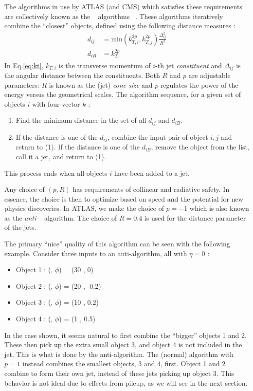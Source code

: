 The algorithms in use by ATLAS (and CMS) which satisfies these requirements are collectively known as the \kt~ algorithms ~\cite{Ellis:1993tq,Cacciari:2005hq,Cacciari:2008gp}.
These algorithms iteratively combine the ``closest'' objects, defined using the following distance measures :
\begin{equation}
\begin{aligned}\label{eq:kt}
d_{ij} &= \text{min}(k_{T,i}^{2p} , k_{T,j}^{2p} )  \frac{\Delta_{ij}^2 }{R^2} \\
d_{iB} &= k_{T_i}^{2p}
\end{aligned}
\end{equation}
In Eq.\ref{eq:kt}, $k_{T,i}$ is the transverse momentum of $i$-th jet \textit{constituent} and $\Delta_{ij}$ is the angular distance \deltaR between the constituents.
Both $R$ and $p$ are adjustable parameters: $R$ is known as the (jet) \textit{cone size} and $p$ regulates the power of the energy versus the geometrical scales.
The algorithm sequence, for a given set of objects $i$ with four-vector $k$ :
\begin{enumerate}
\item Find the minimum distance in the set of all $d_{ij}$ and $d_{iB}$.
\item If the distance is one of the $d_{ij}$, combine the input pair of object $i,j$ and return to (1).
If the distance is one of the $d_{iB}$, remove the object from the list, call it a jet, and return to (1).
\end{enumerate}
This process ends when all objects $i$ have been added to a jet.

Any choice of $(p,R)$ has requirements of collinear and radiative safety.
In essence, the choice is then to optimize based on speed and the potential for new physics discoveries.
In ATLAS, we make the choice of $p = -1$ which is also known as the \textit{anti-}\kt~ algorithm.
The choice of $R = 0.4$ is used for the distance parameter of the jets.

The primary ``nice'' quality of this algorithm can be seen with the following example.
Consider three inputs to an anti-\kt algorithm, all with $\eta = 0$ :
\begin{itemize}
\item Object 1 : (\pt, $\phi$) = (30 \GeV, 0)
\item Object 2 : (\pt, $\phi$) = (20 \GeV, -0.2)
\item Object 3 : (\pt, $\phi$) = (10 \GeV, 0.2)
\item Object 4 : (\pt, $\phi$) = (1  \GeV, 0.5)
\end{itemize}
In the case shown, it seems natural to first combine the ``bigger'' objects 1 and 2.
These then pick up the extra small object 3, and object 4 is not included in the jet.
This is what is done by the anti-\kt algorithm.
The (normal) \kt algorithm with $p = 1$ instead combines the smallest objects, 3 and 4, first.
Object 1 and 2 combine to form their own jet, instead of these jets picking up object 3.
This behavior is not ideal due to effects from pileup, as we will see in the next section.

